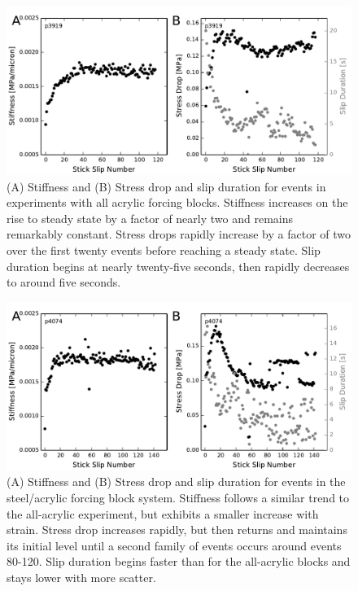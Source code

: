 \begin{figure}
\begin{center}
\includegraphics{chap_granular_stiffness/Fig9.pdf}
\caption{\label{fig:p3919_picks}
(A) Stiffness and (B) Stress drop and slip duration for events in experiments with all acrylic forcing blocks.  Stiffness increases on the rise to steady state by a factor of nearly two and remains remarkably constant. Stress drops rapidly increase by a factor of two over the first twenty events before reaching a steady state.  Slip duration begins at nearly twenty-five seconds, then rapidly decreases to around five seconds.}
\end{center}
\end{figure}

\begin{figure}
\begin{center}
\includegraphics{chap_granular_stiffness/Fig10.pdf}
\caption{\label{fig:p4074_picks}
(A) Stiffness and (B) Stress drop and slip duration for events in the steel/acrylic forcing block system. Stiffness follows a similar trend to the all-acrylic experiment, but exhibits a smaller increase with strain. Stress drop increases rapidly, but then returns and maintains its initial level until a second family of events occurs around events 80-120.  Slip duration begins faster than for the all-acrylic blocks and stays lower with more scatter.  }
\end{center}
\end{figure}

